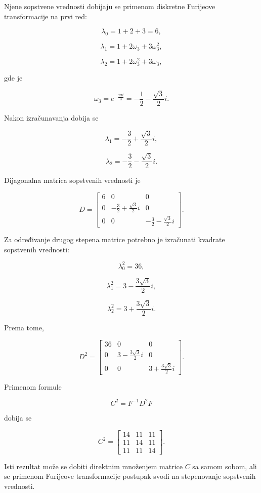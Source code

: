 \documentclass[12pt,a4paper]{report}
\begin{document}
Njene sopstvene vrednosti dobijaju se primenom diskretne Furijeove transformacije na prvi red:

\[
\lambda_0=1+2+3=6,
\]

\[
\lambda_1=1+2\omega_3+3\omega_3^2,
\]

\[
\lambda_2=1+2\omega_3^2+3\omega_3,
\]

gde je

\[
\omega_3=e^{-\frac{2\pi i}{3}}
=-\frac12-\frac{\sqrt{3}}{2}i.
\]

Nakon izračunavanja dobija se

\[
\lambda_1=-\frac32+\frac{\sqrt{3}}{2}i,
\]

\[
\lambda_2=-\frac32-\frac{\sqrt{3}}{2}i.
\]

Dijagonalna matrica sopstvenih vrednosti je

\[
D=
\begin{bmatrix}
	6 & 0 & 0\\
	0 & -\frac32+\frac{\sqrt{3}}{2}i & 0\\
	0 & 0 & -\frac32-\frac{\sqrt{3}}{2}i
\end{bmatrix}.
\]

Za određivanje drugog stepena matrice potrebno je izračunati kvadrate sopstvenih vrednosti:

\[
\lambda_0^2=36,
\]

\[
\lambda_1^2=3-\frac{3\sqrt{3}}{2}i,
\]

\[
\lambda_2^2=3+\frac{3\sqrt{3}}{2}i.
\]

Prema tome,

\[
D^2=
\begin{bmatrix}
	36 & 0 & 0\\
	0 & 3-\frac{3\sqrt{3}}{2}i & 0\\
	0 & 0 & 3+\frac{3\sqrt{3}}{2}i
\end{bmatrix}.
\]

Primenom formule

\[
C^2=F^{-1}D^2F
\]

dobija se

\[
\boxed{
	C^2=
	\begin{bmatrix}
		14 & 11 & 11\\
		11 & 14 & 11\\
		11 & 11 & 14
	\end{bmatrix}
}.
\]

Isti rezultat može se dobiti direktnim množenjem matrice \(C\) sa samom sobom, ali se primenom Furijeove transformacije postupak svodi na stepenovanje sopstvenih vrednosti.
\end{document}
